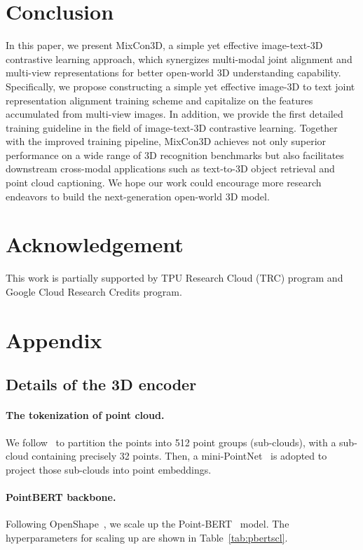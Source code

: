 \documentclass{article} \usepackage{iclr2024_conference,times}
\newcommand{\ourmethod}{MixCon3D}
\begin{document}
\section{Conclusion}
\label{sec:conclusion}
In this paper, we present \ourmethod, a simple yet effective image-text-3D contrastive learning approach, which synergizes multi-modal joint alignment and multi-view representations for better open-world 3D understanding capability.
Specifically, we propose constructing a simple yet effective image-3D to text joint representation alignment training scheme and capitalize on the features accumulated from multi-view images.
In addition, we provide the first detailed training guideline in the field of image-text-3D contrastive learning.  
Together with the improved training pipeline, MixCon3D achieves not only superior performance on a wide range of 3D recognition benchmarks but also facilitates downstream cross-modal applications such as text-to-3D object retrieval and point cloud captioning. 
We hope our work could encourage more research endeavors to build the next-generation open-world 3D model. 


\section*{Acknowledgement}
This work is partially supported by TPU Research Cloud (TRC) program and Google Cloud Research Credits program.





\clearpage
\appendix
\section{Appendix}

\subsection{Details of the 3D encoder}
\paragraph{The tokenization of point cloud.} 
We follow~\citet{point-bert} to partition the points into 512 point groups (sub-clouds), with a sub-cloud containing precisely 32 points. 
Then, a mini-PointNet~\citep{pointnet} is adopted to project those sub-clouds into point embeddings.


\paragraph{PointBERT backbone.}
Following OpenShape~\citep{openshape}, we scale up the Point-BERT~\citep{point-bert} model.
The hyperparameters for scaling up are shown in Table~\ref{tab:pbertscl}.
\end{document}

